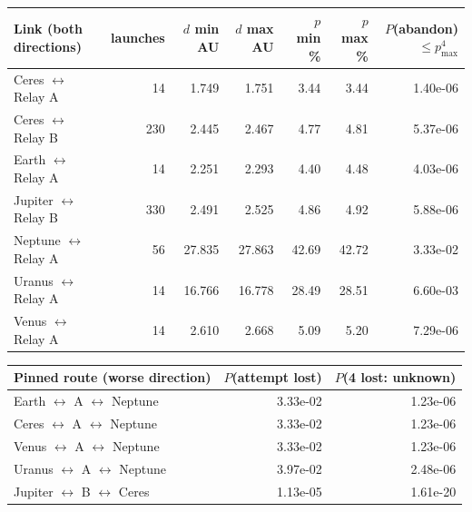 \par\noindent
\begin{tabular}{lrrrrrr}
\toprule
Link (both directions) & launches & $d$ min AU & $d$ max AU & $p$ min \% & $p$ max \% & $P$(abandon) $\le p_{\max}^4$\\
\midrule
Ceres $\leftrightarrow$ Relay A & 14 & 1.749 & 1.751 & 3.44 & 3.44 & 1.40e-06\\
Ceres $\leftrightarrow$ Relay B & 230 & 2.445 & 2.467 & 4.77 & 4.81 & 5.37e-06\\
Earth $\leftrightarrow$ Relay A & 14 & 2.251 & 2.293 & 4.40 & 4.48 & 4.03e-06\\
Jupiter $\leftrightarrow$ Relay B & 330 & 2.491 & 2.525 & 4.86 & 4.92 & 5.88e-06\\
Neptune $\leftrightarrow$ Relay A & 56 & 27.835 & 27.863 & 42.69 & 42.72 & 3.33e-02\\
Uranus $\leftrightarrow$ Relay A & 14 & 16.766 & 16.778 & 28.49 & 28.51 & 6.60e-03\\
Venus $\leftrightarrow$ Relay A & 14 & 2.610 & 2.668 & 5.09 & 5.20 & 7.29e-06\\
\bottomrule
\end{tabular}\par

\medskip
\par\noindent
\begin{tabular}{lrr}
\toprule
Pinned route (worse direction) & $P$(attempt lost) & $P$(4 lost: unknown)\\
\midrule
Earth $\leftrightarrow$ A $\leftrightarrow$ Neptune & 3.33e-02 & 1.23e-06\\
Ceres $\leftrightarrow$ A $\leftrightarrow$ Neptune & 3.33e-02 & 1.23e-06\\
Venus $\leftrightarrow$ A $\leftrightarrow$ Neptune & 3.33e-02 & 1.23e-06\\
Uranus $\leftrightarrow$ A $\leftrightarrow$ Neptune & 3.97e-02 & 2.48e-06\\
Jupiter $\leftrightarrow$ B $\leftrightarrow$ Ceres & 1.13e-05 & 1.61e-20\\
\bottomrule
\end{tabular}\par

